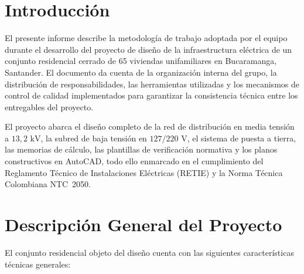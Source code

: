 
\section{Introducci\'on}

El presente informe describe la metodolog\'ia de trabajo adoptada
por el equipo durante el desarrollo del proyecto de dise\~no de
la infraestructura el\'ectrica de un conjunto residencial cerrado
de 65 viviendas unifamiliares en Bucaramanga, Santander. El documento
da cuenta de la organizaci\'on interna del grupo, la distribuci\'on
de responsabilidades, las herramientas utilizadas y los mecanismos
de control de calidad implementados para garantizar la consistencia
t\'ecnica entre los entregables del proyecto.

El proyecto abarca el dise\~no completo de la red de distribuci\'on
en media tensi\'on a $13{,}2\text{ kV}$, la subred de baja tensi\'on
en $127/220\text{ V}$, el sistema de puesta a tierra, las memorias
de c\'alculo, las plantillas de verificaci\'on normativa y los planos
constructivos en AutoCAD, todo ello enmarcado en el cumplimiento del
Reglamento T\'ecnico de Instalaciones El\'ectricas
(RETIE) y la Norma T\'ecnica Colombiana NTC~2050.

\section{Descripci\'on General del Proyecto}

El conjunto residencial objeto del dise\~no cuenta con las siguientes
caracter\'isticas t\'ecnicas generales:

